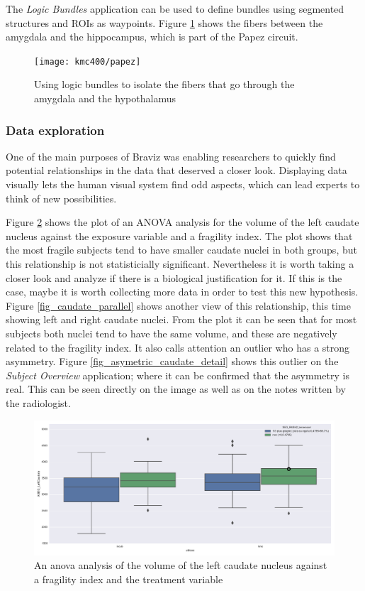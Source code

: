 The \emph{Logic Bundles} application can be used to define bundles using segmented structures and ROIs as waypoints. Figure \ref{fig_papez} shows the fibers between the amygdala and the hippocampus, which is part of the Papez circuit. 

\begin{figure}
\centering
\texttt{[image: kmc400/papez]}
\caption{Using logic bundles to isolate the fibers that go through the amygdala and the hypothalamus
\label{fig_papez}}
\end{figure} 




\subsubsection{Data exploration}

One of the main purposes of Braviz was enabling researchers to quickly find potential relationships in the data that deserved a closer look. Displaying data visually lets the human visual system find odd aspects, which can lead experts to think of new possibilities. 

Figure \ref{fig_anova_example} shows the plot of an ANOVA analysis for the volume of the left caudate nucleus against the exposure variable and a fragility index. The plot shows that the most fragile subjects tend to have smaller caudate nuclei in both groups, but this relationship is not statisticially significant. Nevertheless it is worth taking a closer look and analyze if there is a biological justification for it. If this is the case, maybe it is worth collecting more data in order to test this new hypothesis. Figure \ref{fig_caudate_parallel} shows another view of this relationship, this time showing left and right caudate nuclei. From the plot it can be seen that for most subjects both nuclei tend to have the same volume, and these are negatively related to the fragility index. It also calls attention an outlier who has a strong asymmetry. Figure \ref{fig_asymetric_caudate_detail} shows this outlier on the \emph{Subject Overview} application; where it can be confirmed that the asymmetry is real. This can be seen directly on the image as well as on the notes written by the radiologist.


\begin{figure}
	\centering
		\includegraphics[width=\textwidth]{figures/kmc400/left_caudate_fragility_anova}
	\caption{An anova analysis of the volume of the left caudate nucleus against a fragility index and the treatment variable}
	\label{fig_anova_example}
\end{figure}


